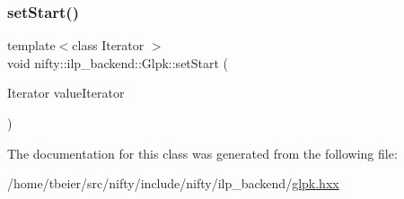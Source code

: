 \subsubsection{\texorpdfstring{set\+Start()}{setStart()}}
{\footnotesize\ttfamily template$<$class Iterator $>$ \\
void nifty\+::ilp\+\_\+backend\+::\+Glpk\+::set\+Start (\begin{DoxyParamCaption}\item[{Iterator}]{value\+Iterator }\end{DoxyParamCaption})\hspace{0.3cm}{\ttfamily [inline]}}



The documentation for this class was generated from the following file\+:\begin{DoxyCompactItemize}
\item 
/home/tbeier/src/nifty/include/nifty/ilp\+\_\+backend/\hyperlink{glpk_8hxx}{glpk.\+hxx}\end{DoxyCompactItemize}
